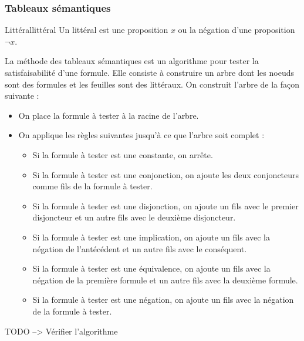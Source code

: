 \subsubsection{Tableaux sémantiques}
\begin{definition}{Littéral}{littéral}
  Un littéral est une proposition $x$ ou la négation d'une proposition $\neg x$.
\end{definition}
La méthode des tableaux sémantiques est un algorithme pour tester la satisfaisabilité d'une formule. Elle consiste à construire un arbre dont les noeuds sont des formules et les feuilles sont des littéraux. On construit l'arbre de la façon suivante :
\begin{itemize}[label=$\bullet$]
  \item On place la formule à tester à la racine de l'arbre.
  \item On applique les règles suivantes jusqu'à ce que l'arbre soit complet :
  \begin{itemize}[label=$\circ$]
    \item Si la formule à tester est une constante, on arrête.
    \item Si la formule à tester est une conjonction, on ajoute les deux conjoncteurs comme fils de la formule à tester.
    \item Si la formule à tester est une disjonction, on ajoute un fils avec le premier disjoncteur et un autre fils avec le deuxième disjoncteur.
    \item Si la formule à tester est une implication, on ajoute un fils avec la négation de l'antécédent et un autre fils avec le conséquent.
    \item Si la formule à tester est une équivalence, on ajoute un fils avec la négation de la première formule et un autre fils avec la deuxième formule.
    \item Si la formule à tester est une négation, on ajoute un fils avec la négation de la formule à tester.
  \end{itemize}
\end{itemize}
\begin{remark}
  TODO --> Vérifier l'algorithme
\end{remark}